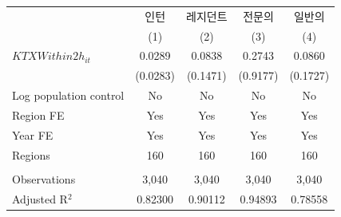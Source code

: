 \begingroup
\centering
\begin{tabular}{lcccc}
   \toprule
                          & 인턴     & 레지던트 & 전문의   & 일반의 \\   
                          & (1)      & (2)      & (3)      & (4)\\  
   \midrule 
   $KTXWithin2h_{it}$     & 0.0289   & 0.0838   & 0.2743   & 0.0860\\   
                          & (0.0283) & (0.1471) & (0.9177) & (0.1727)\\   
   Log population control & No       & No       & No       & No\\  
   Region FE              & Yes      & Yes      & Yes      & Yes\\  
   Year FE                & Yes      & Yes      & Yes      & Yes\\  
   Regions                & 160      & 160      & 160      & 160\\  
    \\
   Observations           & 3,040    & 3,040    & 3,040    & 3,040\\  
   Adjusted R$^2$         & 0.82300  & 0.90112  & 0.94893  & 0.78558\\  
   \bottomrule
\end{tabular}
\par\endgroup
